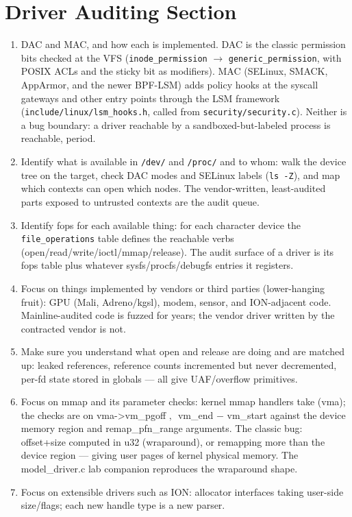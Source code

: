 \documentclass[12pt]{Training}
\begin{document}
\section*{Driver Auditing Section}
\begin{enumerate}
    \item DAC and MAC, and how each is implemented. DAC is the classic permission bits checked at the VFS (\lstinline{inode_permission} $\to$ \lstinline{generic_permission}, with POSIX ACLs and the sticky bit as modifiers). MAC (SELinux, SMACK, AppArmor, and the newer BPF-LSM) adds policy hooks at the syscall gateways and other entry points through the LSM framework (\lstinline{include/linux/lsm_hooks.h}, called from \lstinline{security/security.c}). Neither is a bug boundary: a driver reachable by a sandboxed-but-labeled process is reachable, period.
    \item Identify what is available in \lstinline{/dev/} and \lstinline{/proc/} and to whom: walk the device tree on the target, check DAC modes and SELinux labels (\lstinline{ls -Z}), and map which contexts can open which nodes. The vendor-written, least-audited parts exposed to untrusted contexts are the audit queue.
    \item Identify fops for each available thing: for each character device the \lstinline{file_operations} table defines the reachable verbs (open/read/write/ioctl/mmap/release). The audit surface of a driver is its fops table plus whatever sysfs/procfs/debugfs entries it registers.
    \item Focus on things implemented by vendors or third parties (lower-hanging fruit): GPU (Mali, Adreno/kgsl), modem, sensor, and ION-adjacent code. Mainline-audited code is fuzzed for years; the vendor driver written by the contracted vendor is not.
    \item Make sure you understand what open and release are doing and are matched up: leaked references, reference counts incremented but never decremented, per-fd state stored in globals --- all give UAF/overflow primitives.
    \item Focus on mmap and its parameter checks: kernel mmap handlers take (vma); the checks are on vma->vm\_pgoff $,\,$ vm\_end $-$ vm\_start against the device memory region and remap\_pfn\_range arguments. The classic bug: offset+size computed in u32 (wraparound), or remapping more than the device region --- giving user pages of kernel physical memory. The model\_driver.c lab companion reproduces the wraparound shape.
    \item Focus on extensible drivers such as ION: allocator interfaces taking user-side size/flags; each new handle type is a new parser.

\end{enumerate}
\end{document}
